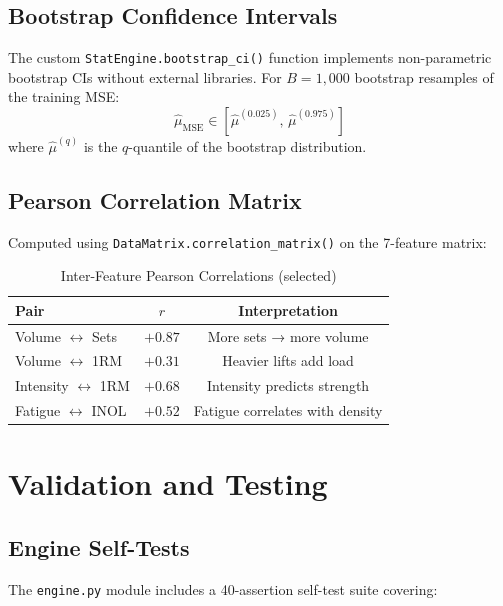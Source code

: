 \documentclass[12pt,a4paper]{report}
\theoremstyle{definition}
\begin{document}
\section{Bootstrap Confidence Intervals}

The custom \texttt{StatEngine.bootstrap\_ci()} function implements non-parametric
bootstrap CIs without external libraries. For $B = 1{,}000$ bootstrap resamples
of the training MSE:
\[
  \hat{\mu}_{\text{MSE}} \in [\hat{\mu}^{(0.025)},\, \hat{\mu}^{(0.975)}]
\]
where $\hat{\mu}^{(q)}$ is the $q$-quantile of the bootstrap distribution.

\section{Pearson Correlation Matrix}

Computed using \texttt{DataMatrix.correlation\_matrix()} on the 7-feature matrix:

\begin{table}[h!]
\centering
\caption{Inter-Feature Pearson Correlations (selected)}
\begin{tabular}{lcc}
\toprule
\textbf{Pair} & \textbf{$r$} & \textbf{Interpretation} \\
\midrule
Volume $\leftrightarrow$ Sets  & $+0.87$ & More sets → more volume \\
Volume $\leftrightarrow$ 1RM   & $+0.31$ & Heavier lifts add load \\
Intensity $\leftrightarrow$ 1RM& $+0.68$ & Intensity predicts strength \\
Fatigue $\leftrightarrow$ INOL & $+0.52$ & Fatigue correlates with density \\
\bottomrule
\end{tabular}
\end{table}

\chapter{Validation and Testing}

\section{Engine Self-Tests}

The \texttt{engine.py} module includes a 40-assertion self-test suite covering:
\end{document}
